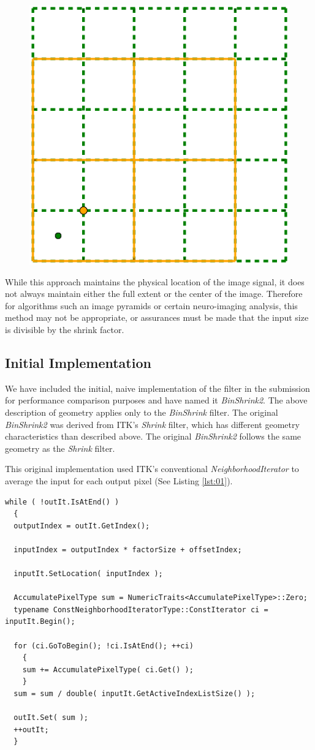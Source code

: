 \documentclass{InsightArticle}
\begin{document}
\begin{figure}
  \centering
  \includegraphics[width=0.4\linewidth]{images/pixelgrid}
  \label{fig:PixelGrid}
\end{figure}

While this approach maintains the physical location of the image
signal, it does not always maintain either the full extent or the
center of the image. Therefore for algorithms such an image pyramids or certain
neuro-imaging analysis, this method may not be appropriate, or
assurances must be made that the input size is divisible by the shrink factor.

\subsection{Initial Implementation}

We have included the initial, naive implementation of the filter in the
submission for performance comparison purposes and have named it
\textit{BinShrink2}. The above description of geometry applies only to the
\textit{BinShrink} filter. The original \textit{BinShrink2} was
derived from ITK's \textit{Shrink} filter, which has different
geometry characteristics than described above. The original \textit{BinShrink2}
follows the same geometry as the \textit{Shrink} filter.

This original implementation used ITK's conventional
\textit{NeighborhoodIterator} to average the input for each output
pixel (See Listing \ref{lst:01}).

\begin{lstlisting}[label=lst:01, caption={A selected section of code
      from \textit{BinShrink2} filter using the neighborhood iterator.}]
while ( !outIt.IsAtEnd() )
  {
  outputIndex = outIt.GetIndex();

  inputIndex = outputIndex * factorSize + offsetIndex;

  inputIt.SetLocation( inputIndex );

  AccumulatePixelType sum = NumericTraits<AccumulatePixelType>::Zero;
  typename ConstNeighborhoodIteratorType::ConstIterator ci = inputIt.Begin();

  for (ci.GoToBegin(); !ci.IsAtEnd(); ++ci)
    {
    sum += AccumulatePixelType( ci.Get() );
    }
  sum = sum / double( inputIt.GetActiveIndexListSize() );

  outIt.Set( sum );
  ++outIt;
  }
\end{lstlisting}
\end{document}
